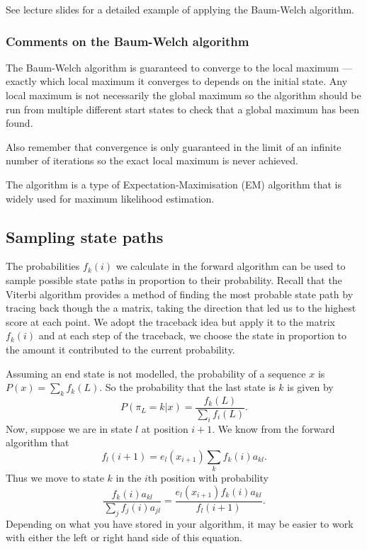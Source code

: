 \documentclass[11pt]{article}
\begin{document}
See lecture slides for a detailed example of applying the Baum-Welch algorithm.

\subsubsection{Comments on the Baum-Welch algorithm}

The Baum-Welch algorithm is guaranteed to converge to the local maximum ---  exactly which local maximum it converges to depends on the initial state.  Any local maximum is not necessarily the global maximum so the algorithm should be run from multiple different start states to check that a global maximum has been found.  

Also remember that convergence is only guaranteed in the limit of an infinite number of iterations so the exact local maximum is never achieved.  

The algorithm is a type of Expectation-Maximisation (EM) algorithm that is widely used for maximum likelihood estimation.



\subsection{Sampling state paths} \label{sec:sampling}

The probabilities $f_{k}(i)$ we calculate in the forward algorithm can be used to   sample possible state paths in proportion to their probability.  Recall that the Viterbi algorithm provides a method of finding the most probable state path by tracing back though the a matrix, taking the direction that led us to the highest score at each point.  
We adopt the traceback idea but apply it to the matrix $f_k(i)$ and at each step of the traceback, we choose the state in proportion to the amount it contributed to the current probability.  

Assuming an end state is not modelled, the probability of a sequence $x$ is $P(x)  = \sum_k f_k(L)$.  So the probability that the last state is $k$ is given by 
\[P(\pi_L = k |x ) = \frac{f_k(L)}{ \sum_i f_i(L)}. \]
Now, suppose we are in state $l$ at position $i+1$.  We know from the forward algorithm that 
\[ f_l(i+1) = e_l(x_{i+1}) \sum_k f_k(i)a_{kl}. \]
Thus we move to state $k$ in the $i$th position with probability 
\[\frac{f_k(i)a_{kl}} {\sum_j f_j(i)a_{jl} } =  \frac{ e_l(x_{i+1}) f_k(i)a_{kl}} {f_l(i+1)}. \] 
Depending on what you have stored in your algorithm, it may be easier to work with either the left or right hand side of this equation.   
\end{document}
